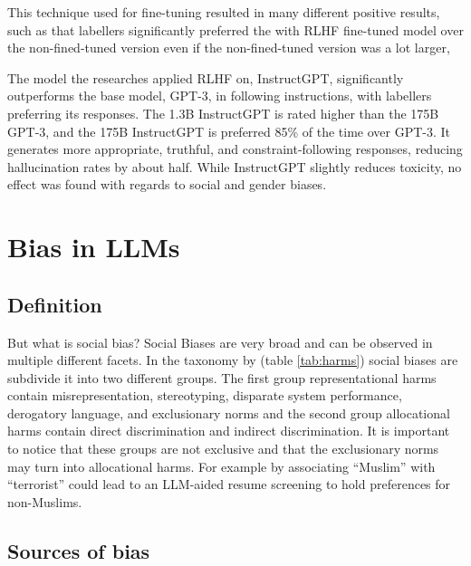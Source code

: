 This technique used for fine-tuning resulted in many different positive results, such as that labellers significantly preferred the with RLHF fine-tuned model over the non-fined-tuned version even if the non-fined-tuned version was a lot larger, 

The model the researches applied RLHF on, InstructGPT, significantly outperforms the base model, GPT-3, in following instructions, with labellers preferring its responses. The 1.3B InstructGPT is rated higher than the 175B GPT-3, and the 175B InstructGPT is preferred 85\% of the time over GPT-3. It generates more appropriate, truthful, and constraint-following responses, reducing hallucination rates by about half. While InstructGPT slightly reduces toxicity, no effect was found with regards to social and gender biases\citep{ouyang2022training}.

\section{Bias in LLMs}
\label{sec:gender-bias-in-llm}

\subsection{Definition}

But what is social bias? Social Biases are very broad and can be observed in multiple different facets. In the taxonomy by \citet{gallegos_bias_2024} (table \ref{tab:harms}) social biases are subdivide it into two different groups. The first group representational harms contain misrepresentation, stereotyping, disparate system performance, derogatory language, and exclusionary norms and the second group allocational harms contain direct discrimination and indirect discrimination. It is important to notice that these groups are not exclusive and that the exclusionary norms may turn into allocational harms. For example by associating “Muslim” with “terrorist” could lead to an LLM-aided resume screening to hold preferences for non-Muslims.


\subsection{Sources of bias}

